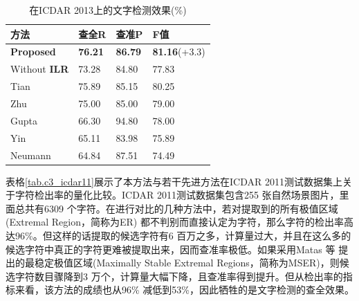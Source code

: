         \begin{table}[!h]
        \centering
        \caption{在ICDAR 2013上的文字检测效果(\%)}
        \begin{tabular}{p{}|p{} p{} p{}}
        \hline
        方法 & 查全R & 查准P & F值 \\
        \hline
        \textbf{Proposed} & \textbf{76.21} & \textbf{86.79} & \textbf{81.16}(+3.3) \\
        Without \textbf{ILR} & 73.28 & 84.80 & 77.83 \\
        \hline
        Tian\cite{Tian2016Text} & 75.89 & 85.15 & 80.25 \\
        Zhu\cite{Zhu2016Text} & 75.00 & 85.00 & 79.00 \\
        Gupta\cite{Gupta2016Synthetic} & 66.30 & 94.80 & 78.00 \\
        Yin\cite{Yin2013Robust} & 65.11 & 83.98 & 75.89 \\
        Neumann\cite{Neumann2012Real} & 64.84 & 87.51 & 74.49 \\
        \hline
        \end{tabular}
        \label{tab.c3_icdar13}
        \end{table}

        表格\ref{tab.c3_icdar11}展示了本方法与若干先进方法在ICDAR 2011测试数据集上关于字符检出率的量化比较。ICDAR 2011测试数据集包含255 张自然场景图片，里面总共有6309 个字符。在进行对比的几种方法中，若对提取到的所有极值区域(Extremal Region，简称为ER) 都不判别而直接认定为字符，那么字符的检出率高达96\%。但这样的话提取的候选字符有6 百万之多，计算量过大，并且在这么多的候选字符中真正的字符更难被提取出来，因而查准率极低。如果采用Matas 等\cite{Matas2004Robust} 提出的最稳定极值区域(Maximally Stable Extremal Regions，简称为MSER)，则候选字符数目骤降到3 万个，计算量大幅下降，且查准率得到提升。但从检出率的指标来看，该方法的成绩也从96\% 减低到53\%，因此牺牲的是文字检测的查全效果。

